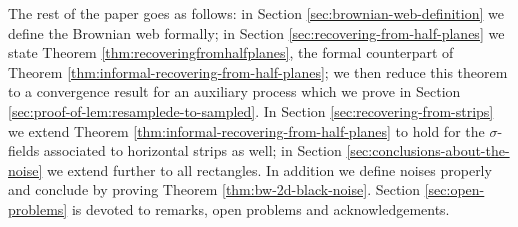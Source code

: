 {The rest of the paper goes as follows: in Section \ref{sec:brownian-web-definition} we define the
Brownian web formally; in Section \ref{sec:recovering-from-half-planes} we state Theorem \ref{thm:recoveringfromhalfplanes}, the formal
counterpart of Theorem \ref{thm:informal-recovering-from-half-planes}; we then reduce this theorem to a
convergence result for an auxiliary process which we prove in Section
\ref{sec:proof-of-lem:resamplede-to-sampled}.  In Section \ref{sec:recovering-from-strips} we extend Theorem \ref{thm:informal-recovering-from-half-planes} to hold for the
$\sigma$-fields associated to horizontal strips as well; in Section \ref{sec:conclusions-about-the-noise}
we extend further to all rectangles.  In addition we define noises
properly and conclude by proving Theorem \ref{thm:bw-2d-black-noise}.  Section \ref{sec:open-problems} is devoted to
remarks, open problems and acknowledgements.
}

